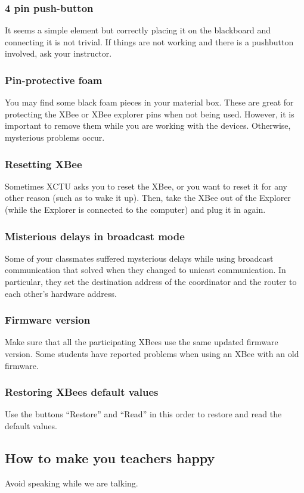\subsubsection{4 pin push-button}
It seems a simple element but correctly placing it on the blackboard and connecting it is not trivial.
If things are not working and there is a pushbutton involved, ask your instructor.

\subsubsection{Pin-protective foam}
You may find some black foam pieces in your material box.
These are great for protecting the XBee or XBee explorer pins when not being used.
However, it is important to remove them while you are working with the devices.
Otherwise, mysterious problems occur.

\subsubsection{Resetting XBee}
Sometimes XCTU asks you to reset the XBee, or you want to reset it for any other reason (such as to wake it up).
Then, take the XBee out of the Explorer (while the Explorer is connected to the computer) and plug it in again.

\subsubsection{Misterious delays in broadcast mode}
Some of your classmates suffered mysterious delays while using broadcast communication that solved when they changed to unicast communication.
In particular, they set the destination address of the coordinator and the router to each other's hardware address.

\subsubsection{Firmware version}
Make sure that all the participating XBees use the same updated firmware version.
Some students have reported problems when using an XBee with an old firmware.

\subsubsection{Restoring XBees default values}
Use the buttons ``Restore'' and ``Read'' in this order to restore and read the default values.

\subsection{How to make you teachers happy}

Avoid speaking while we are talking.
